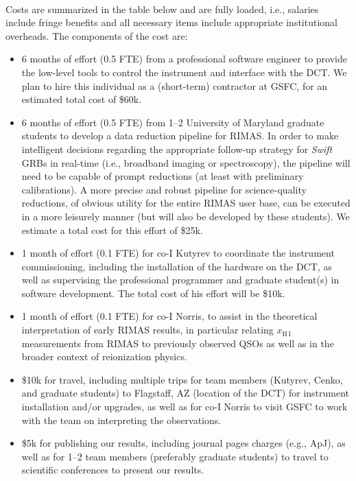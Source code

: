 \documentclass[letterpaper,11pt]{article}
\newcommand{\apj}{ApJ}%
\begin{document}
\clearpage

\smallskip\\
Costs are summarized in the table below and are fully loaded, i.e., salaries include
fringe benefits and all necessary items include appropriate institutional overheads.
The components of the cost are:
\begin{itemize}
\item 6 months of effort (0.5 FTE) from a professional software engineer to provide
the low-level tools to control the instrument and interface with the DCT.  We plan
to hire this individual as a (short-term) contractor at GSFC, for an estimated total
cost of \$60k.
\item 6 months of effort (0.5 FTE) from 1--2 University of Maryland graduate students
to develop a data reduction pipeline for RIMAS.  In order to make intelligent
decisions regarding the appropriate follow-up strategy for \textit{Swift} GRBs in
real-time (i.e., broadband imaging or spectroscopy), the pipeline will need to be
capable of prompt reductions (at least with preliminary calibrations).  A more 
precise and robust pipeline for science-quality reductions, of obvious utility 
for the entire RIMAS user base, can be executed in a more leisurely manner (but will
also be developed by these students).  We estimate a total cost for this effort 
of \$25k.
\item 1 month of effort (0.1 FTE) for co-I Kutyrev to coordinate the instrument 
commissioning, including the installation of the hardware on the DCT, as well as 
supervising the professional programmer and graduate student(s) in software 
development.  The total cost of his effort will be \$10k.
\item 1 month of effort (0.1 FTE) for co-I Norris, to assist in the theoretical
interpretation of early RIMAS results, in particular relating $x_{\mathrm{H\,I}}$
measurements from RIMAS to previously observed QSOs as well as in the broader 
context of reionization physics.
\item \$10k for travel, including multiple trips for team members (Kutyrev, Cenko,
and graduate students) to Flagstaff, AZ (location of the DCT) for instrument 
installation and/or upgrades, as well as for co-I Norris to visit GSFC to work 
with the team on interpreting the observations.
\item \$5k for publishing our results, including journal pages charges (e.g., \apj),
as well as for 1--2 team members (preferably graduate students) to travel to 
scientific conferences to present our results.
\end{itemize}
\end{document}

